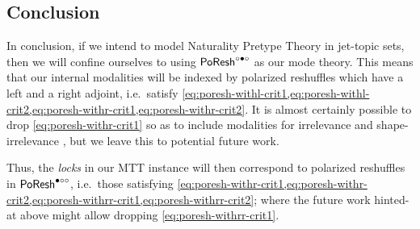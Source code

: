 \documentclass[a4paper]{memoir}
\begin{document}
\subsection{Conclusion} \label{sec:poresh-jtset:conclusion}
In conclusion, if we intend to model Naturality Pretype Theory in jet-topic sets, then we will confine ourselves to using $\mathsf{PoResh}^{\circ \bullet \circ}$ as our mode theory.
This means that our internal modalities will be indexed by polarized reshuffles which have a left and a right adjoint, i.e.\ satisfy \cref{eq:poresh-withl-crit1,eq:poresh-withl-crit2,eq:poresh-withr-crit1,eq:poresh-withr-crit2}.
It is almost certainly possible to drop \cref{eq:poresh-withr-crit1} so as to include modalities for irrelevance and shape-irrelevance \cite{reldtt}, but we leave this to potential future work.

Thus, the \emph{locks} in our MTT instance will then correspond to polarized reshuffles in $\mathsf{PoResh}^{\bullet \circ \circ}$, i.e.\ those satisfying \cref{eq:poresh-withr-crit1,eq:poresh-withr-crit2,eq:poresh-withrr-crit1,eq:poresh-withrr-crit2}; where the future work hinted-at above might allow dropping \cref{eq:poresh-withrr-crit1}.
\end{document}
